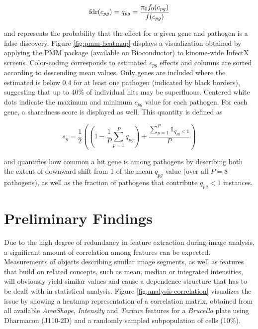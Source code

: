 

\begin{equation}
  \operatorname{fdr}(c_{pg}) = q_{pg} = \frac{\pi_0 f_0(c_{pg})}{f(c_{pg})}
\end{equation}

and represents the probability that the effect for a given gene and pathogen is a false discovery. Figure \ref{fig:pmm-heatmap} displays a visualization obtained by applying the PMM package (available on Bioconductor) to kinome-wide InfectX screens. Color-coding corresponds to estimated $c_{pg}$ effects and columns are sorted according to descending mean values. Only genes are included where the estimated  is below 0.4 for at least one pathogen (indicated by black borders), suggesting that up to 40\% of individual hits may be superfluous. Centered white dots indicate the maximum and minimum $c_{pg}$ value for each pathogen. For each gene, a sharedness score is displayed as well. This quantity is defined as

\begin{equation}
  s_g = \frac{1}{2} \left(\left(1-\frac{1}{P}\sum_{p=1}^P q_{pg}\right) + \frac{\sum_{p=1}^P \mathds{1}_{q_{pg} < 1}}{P}\right)
\end{equation}

and quantifies how common a hit gene is among pathogens by describing both the extent of downward shift from 1 of the mean $q_{pg}$ value (over all $P=8$ pathogens), as well as the fraction of pathogens that contribute $q_{pg} < 1$ instances.

\section{Preliminary Findings}
Due to the high degree of redundancy in feature extraction during image analysis, a significant amount of correlation among features can be expected. Measurements of objects describing similar image segments, as well as features that build on related concepts, such as mean, median or integrated intensities, will obviously yield similar values and cause a dependence structure that has to be dealt with in statistical analysis. Figure \ref{fig:analysis-correlation} visualizes the issue by showing a heatmap representation of a correlation matrix, obtained from all available \textit{AreaShape}, \textit{Intensity} and \textit{Texture} features for a \textit{Brucella} plate using Dharmacon  (J110-2D) and a randomly sampled subpopulation of cells (10\%).

